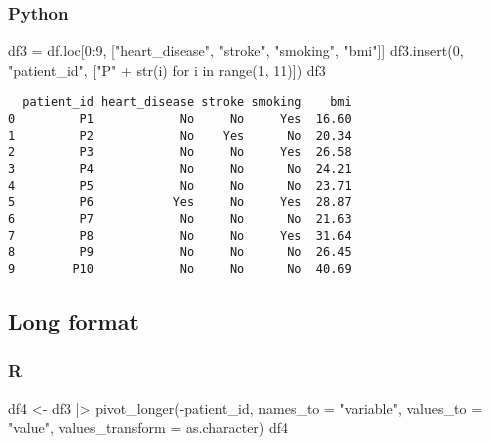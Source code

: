\documentclass[
  letterpaper,
  DIV=11,
  numbers=noendperiod]{scrreprt}
\newenvironment{Shaded}{\begin{snugshade}}{\end{snugshade}}
\newcommand{\AttributeTok}[1]{\textcolor[rgb]{0.40,0.46,0.14}{#1}}
\newcommand{\BuiltInTok}[1]{\textcolor[rgb]{0.00,0.46,0.62}{#1}}
\newcommand{\ControlFlowTok}[1]{\textcolor[rgb]{0.00,0.46,0.62}{#1}}
\newcommand{\DecValTok}[1]{\textcolor[rgb]{0.68,0.00,0.00}{#1}}
\newcommand{\FunctionTok}[1]{\textcolor[rgb]{0.28,0.35,0.67}{#1}}
\newcommand{\KeywordTok}[1]{\textcolor[rgb]{0.00,0.46,0.62}{#1}}
\newcommand{\NormalTok}[1]{\textcolor[rgb]{0.00,0.46,0.62}{#1}}
\newcommand{\OperatorTok}[1]{\textcolor[rgb]{0.37,0.37,0.37}{#1}}
\newcommand{\OtherTok}[1]{\textcolor[rgb]{0.00,0.46,0.62}{#1}}
\newcommand{\SpecialCharTok}[1]{\textcolor[rgb]{0.37,0.37,0.37}{#1}}
\newcommand{\StringTok}[1]{\textcolor[rgb]{0.13,0.47,0.30}{#1}}
\begin{document}
\hypertarget{python-30}{%
\subsubsection{Python}\label{python-30}}

\begin{Shaded}
\begin{Highlighting}[]
\NormalTok{df3 }\OperatorTok{=}\NormalTok{ df.loc[}\DecValTok{0}\NormalTok{:}\DecValTok{9}\NormalTok{, [}\StringTok{"heart\_disease"}\NormalTok{, }\StringTok{"stroke"}\NormalTok{, }\StringTok{"smoking"}\NormalTok{, }\StringTok{"bmi"}\NormalTok{]]}
\NormalTok{df3.insert(}\DecValTok{0}\NormalTok{, }\StringTok{"patient\_id"}\NormalTok{, [}\StringTok{"P"} \OperatorTok{+} \BuiltInTok{str}\NormalTok{(i) }\ControlFlowTok{for}\NormalTok{ i }\KeywordTok{in} \BuiltInTok{range}\NormalTok{(}\DecValTok{1}\NormalTok{, }\DecValTok{11}\NormalTok{)])}
\NormalTok{df3}
\end{Highlighting}
\end{Shaded}

\begin{verbatim}
  patient_id heart_disease stroke smoking    bmi
0         P1            No     No     Yes  16.60
1         P2            No    Yes      No  20.34
2         P3            No     No     Yes  26.58
3         P4            No     No      No  24.21
4         P5            No     No      No  23.71
5         P6           Yes     No     Yes  28.87
6         P7            No     No      No  21.63
7         P8            No     No     Yes  31.64
8         P9            No     No      No  26.45
9        P10            No     No      No  40.69
\end{verbatim}

\hypertarget{long-format}{%
\subsection{Long format}\label{long-format}}

\hypertarget{r-31}{%
\subsubsection{R}\label{r-31}}

\begin{Shaded}
\begin{Highlighting}[]
\NormalTok{df4 }\OtherTok{\textless{}{-}}\NormalTok{ df3 }\SpecialCharTok{|\textgreater{}} 
    \FunctionTok{pivot\_longer}\NormalTok{(}\SpecialCharTok{{-}}\NormalTok{patient\_id, }\AttributeTok{names\_to =} \StringTok{"variable"}\NormalTok{, }\AttributeTok{values\_to =} \StringTok{"value"}\NormalTok{,}
                 \AttributeTok{values\_transform =}\NormalTok{ as.character)}
\NormalTok{df4}
\end{Highlighting}
\end{Shaded}
\end{document}
